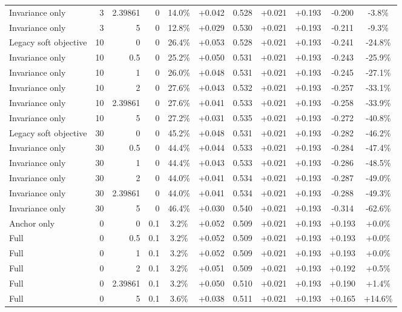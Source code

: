 \begin{table}[htbp]
\begin{tabular}{lrrrccccccc}
Invariance only & 3 & 2.39861 & 0 & 14.0\% & +0.042 & 0.528 & +0.021 & +0.193 & -0.200 & -3.8\% \\
Invariance only & 3 & 5 & 0 & 12.8\% & +0.029 & 0.530 & +0.021 & +0.193 & -0.211 & -9.3\% \\
Legacy soft objective & 10 & 0 & 0 & 26.4\% & +0.053 & 0.528 & +0.021 & +0.193 & -0.241 & -24.8\% \\
Invariance only & 10 & 0.5 & 0 & 25.2\% & +0.050 & 0.531 & +0.021 & +0.193 & -0.243 & -25.9\% \\
Invariance only & 10 & 1 & 0 & 26.0\% & +0.048 & 0.531 & +0.021 & +0.193 & -0.245 & -27.1\% \\
Invariance only & 10 & 2 & 0 & 27.6\% & +0.043 & 0.532 & +0.021 & +0.193 & -0.257 & -33.1\% \\
Invariance only & 10 & 2.39861 & 0 & 27.6\% & +0.041 & 0.533 & +0.021 & +0.193 & -0.258 & -33.9\% \\
Invariance only & 10 & 5 & 0 & 27.2\% & +0.031 & 0.535 & +0.021 & +0.193 & -0.272 & -40.8\% \\
Legacy soft objective & 30 & 0 & 0 & 45.2\% & +0.048 & 0.531 & +0.021 & +0.193 & -0.282 & -46.2\% \\
Invariance only & 30 & 0.5 & 0 & 44.4\% & +0.044 & 0.533 & +0.021 & +0.193 & -0.284 & -47.4\% \\
Invariance only & 30 & 1 & 0 & 44.4\% & +0.043 & 0.533 & +0.021 & +0.193 & -0.286 & -48.5\% \\
Invariance only & 30 & 2 & 0 & 44.0\% & +0.041 & 0.534 & +0.021 & +0.193 & -0.287 & -49.0\% \\
Invariance only & 30 & 2.39861 & 0 & 44.0\% & +0.041 & 0.534 & +0.021 & +0.193 & -0.288 & -49.3\% \\
Invariance only & 30 & 5 & 0 & 46.4\% & +0.030 & 0.540 & +0.021 & +0.193 & -0.314 & -62.6\% \\
Anchor only & 0 & 0 & 0.1 & 3.2\% & +0.052 & 0.509 & +0.021 & +0.193 & +0.193 & +0.0\% \\
Full & 0 & 0.5 & 0.1 & 3.2\% & +0.052 & 0.509 & +0.021 & +0.193 & +0.193 & +0.0\% \\
Full & 0 & 1 & 0.1 & 3.2\% & +0.052 & 0.509 & +0.021 & +0.193 & +0.193 & +0.0\% \\
Full & 0 & 2 & 0.1 & 3.2\% & +0.051 & 0.509 & +0.021 & +0.193 & +0.192 & +0.5\% \\
Full & 0 & 2.39861 & 0.1 & 3.2\% & +0.050 & 0.510 & +0.021 & +0.193 & +0.190 & +1.4\% \\
Full & 0 & 5 & 0.1 & 3.6\% & +0.038 & 0.511 & +0.021 & +0.193 & +0.165 & +14.6\% \\

\end{tabular}
\end{table}

